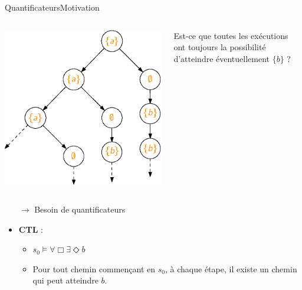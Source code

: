 \documentclass[compress]{beamer}
\begin{document}
\begin{frame}{Quantificateurs}{Motivation}
\small
\begin{columns}
\begin{column}{0.6\linewidth}
  \centering
  \includegraphics[width=0.6\linewidth]{resources/CTL_unfolding2}
\end{column}
\begin{column}{0.5\linewidth}
  Est-ce que \alert{toutes} les exécutions ont toujours \alert{la possibilité} d'atteindre
  éventuellement {\color{DarkOrange}$\{b\}$} ? \\
\end{column}
\end{columns}
\begin{itemize}
  \item[$\rightarrow$] Besoin de quantificateurs
  \item \textbf{\color{fibeamer@orange}CTL} :
  \begin{itemize}
    \item $s_0 \models \forall\Box\exists\Diamond b$
    \item Pour tout chemin commençant en $s_0$, à chaque étape, il existe un chemin qui peut atteindre $b$.
  \end{itemize}
\end{itemize}
\end{frame}
\end{document}
